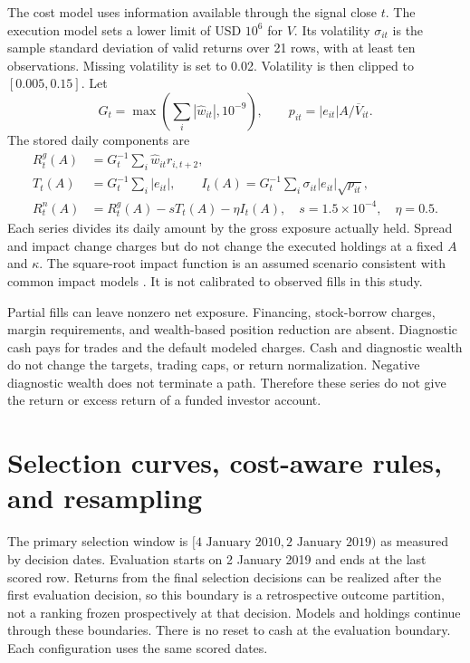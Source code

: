 \documentclass[10pt,letterpaper]{article}
\begin{document}
The cost model uses information available through the signal close $t$. The execution model sets a lower limit of USD $10^6$ for $V$. Its volatility $\sigma_{it}$ is the sample standard deviation of valid returns over 21 rows, with at least ten observations. Missing volatility is set to 0.02. Volatility is then clipped to $[0.005,0.15]$. Let
\[
 G_t=\max\left(\sum_i|\widehat w_{it}|,10^{-9}\right),\qquad
 p_{it}=|e_{it}|A/\overline V_{it}.
\]
The stored daily components are
\begin{align*}
 R_t^{g}(A)&=G_t^{-1}\sum_i\widehat w_{it}r_{i,t+2},\\
 T_t(A)&=G_t^{-1}\sum_i|e_{it}|,\qquad
 I_t(A)=G_t^{-1}\sum_i\sigma_{it}|e_{it}|\sqrt{p_{it}},\\
 R_t^{n}(A)&=R_t^{g}(A)-sT_t(A)-\eta I_t(A),
 \quad s=1.5\times10^{-4},\quad\eta=0.5.
\end{align*}
Each series divides its daily amount by the gross exposure actually held. Spread and impact change charges but do not change the executed holdings at a fixed $A$ and $\kappa$. The square-root impact function is an assumed scenario consistent with common impact models \citep{almgren2005direct,toth2011anomalous}. It is not calibrated to observed fills in this study.

Partial fills can leave nonzero net exposure. Financing, stock-borrow charges, margin requirements, and wealth-based position reduction are absent. Diagnostic cash pays for trades and the default modeled charges. Cash and diagnostic wealth do not change the targets, trading caps, or return normalization. Negative diagnostic wealth does not terminate a path. Therefore these series do not give the return or excess return of a funded investor account.

\section{Selection curves, cost-aware rules, and resampling}\label{sec:uncertainty}
The primary selection window is $[\text{4 January 2010},\text{2 January 2019})$ as measured by decision dates. Evaluation starts on 2 January 2019 and ends at the last scored row. Returns from the final selection decisions can be realized after the first evaluation decision, so this boundary is a retrospective outcome partition, not a ranking frozen prospectively at that decision. Models and holdings continue through these boundaries. There is no reset to cash at the evaluation boundary. Each configuration uses the same scored dates.
\end{document}
